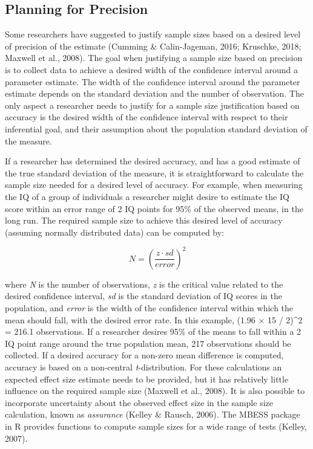 \documentclass[
  english,
  ,jou, a4paper,floatsintext]{apa6}
\begin{document}
\hypertarget{planning-for-precision}{%
\subsection{Planning for Precision}\label{planning-for-precision}}

Some researchers have suggested to justify sample sizes based on a desired level of precision of the estimate (Cumming \& Calin-Jageman, 2016; Kruschke, 2018; Maxwell et al., 2008). The goal when justifying a sample size based on precision is to collect data to achieve a desired width of the confidence interval around a parameter estimate. The width of the confidence interval around the parameter estimate depends on the standard deviation and the number of observation. The only aspect a researcher needs to justify for a sample size justification based on accuracy is the desired width of the confidence interval with respect to their inferential goal, and their assumption about the population standard deviation of the measure.

If a researcher has determined the desired accuracy, and has a good estimate of the true standard deviation of the measure, it is straightforward to calculate the sample size needed for a desired level of accuracy. For example, when measuring the IQ of a group of individuals a researcher might desire to estimate the IQ score within an error range of 2 IQ points for 95\% of the observed means, in the long run. The required sample size to achieve this desired level of accuracy (assuming normally distributed data) can be computed by:

\[N = \left(\frac{z \cdot sd}{error}\right)^2\]

where \emph{N} is the number of observations, \emph{z} is the critical value related to the desired confidence interval, \emph{sd} is the standard deviation of IQ scores in the population, and \emph{error} is the width of the confidence interval within which the mean should fall, with the desired error rate. In this example, (1.96 × 15 / 2)\^{}2 = 216.1 observations. If a researcher desires 95\% of the means to fall within a 2 IQ point range around the true population mean, 217 observations should be collected. If a desired accuracy for a non-zero mean difference is computed, accuracy is based on a non-central \emph{t}-distribution. For these calculations an expected effect size estimate needs to be provided, but it has relatively little influence on the required sample size (Maxwell et al., 2008). It is also possible to incorporate uncertainty about the observed effect size in the sample size calculation, known as \emph{assurance} (Kelley \& Rausch, 2006). The MBESS package in R provides functions to compute sample sizes for a wide range of tests (Kelley, 2007).
\end{document}
